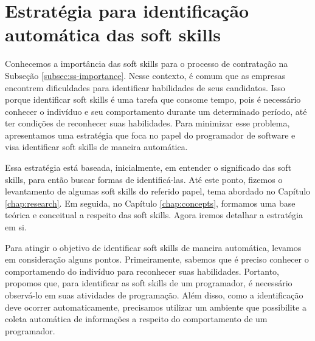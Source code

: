 

\chapter{Estratégia para identificação automática das soft skills}

\label{chap:metrics}

Conhecemos a importância das soft skills para o processo de contratação na Subseção \ref{subsec:ss-importance}. Nesse contexto, é comum que as empresas encontrem dificuldades para identificar habilidades de seus candidatos. Isso porque identificar soft skills é uma tarefa que consome tempo, pois é necessário conhecer o indivíduo e seu comportamento durante um determinado período, até ter condições de reconhecer suas habilidades. Para minimizar esse problema, apresentamos uma estratégia que foca no papel do programador de software e visa identificar soft skills de maneira automática.



Essa estratégia está baseada, inicialmente, em entender o significado das soft skills, para então buscar formas de identificá-las.
Até este ponto, fizemos o levantamento de algumas soft skills do referido papel, tema abordado no Capítulo \ref{chap:research}. Em seguida, no Capítulo \ref{chap:concepts}, formamos uma base teórica e conceitual a respeito das soft skills.
Agora iremos detalhar a estratégia em si.

Para atingir o objetivo de identificar soft skills de maneira automática, levamos em consideração alguns pontos. Primeiramente, sabemos que é preciso conhecer o comportamendo do indivíduo para reconhecer suas habilidades. Portanto, propomos que, para identificar as soft skills de um programador, é necessário observá-lo em suas atividades de programação. Além disso, como a identificação deve ocorrer automaticamente, precisamos utilizar um ambiente que possibilite a coleta automática de informações a respeito do comportamento de um programador.


